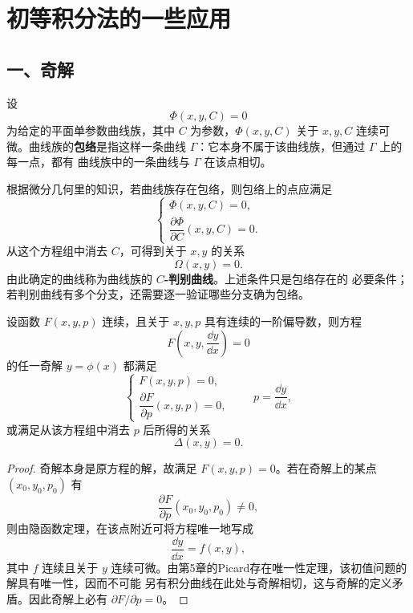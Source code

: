 \section{初等积分法的一些应用}\label{sec:初等积分法的一些应用}

\subsection*{一、奇解}

\begin{definition}\label{def:包络}
	设
\[
	\Phi(x,y,C)=0
\]
为给定的平面单参数曲线族，其中 $C$ 为参数，$\Phi(x,y,C)$ 关于
$x,y,C$ 连续可微。曲线族的\textbf{包络}是指这样一条曲线
$\Gamma$：它本身不属于该曲线族，但通过 $\Gamma$ 上的每一点，都有
曲线族中的一条曲线与 $\Gamma$ 在该点相切。
\end{definition}

根据微分几何里的知识，若曲线族存在包络，则包络上的点应满足
\[
	\begin{cases}
		\Phi(x,y,C)=0,\\
		\dfrac{\partial\Phi}{\partial C}(x,y,C)=0.
	\end{cases}
\]
从这个方程组中消去 $C$，可得到关于 $x,y$ 的关系
\[
	\Omega(x,y)=0.
\]
由此确定的曲线称为曲线族的 \textbf{$C$-判别曲线}。上述条件只是包络存在的
必要条件；若判别曲线有多个分支，还需要逐一验证哪些分支确为包络。

\begin{theorem}\label{thm:奇解的必要条件}
	设函数 $F(x,y,p)$ 连续，且关于 $x,y,p$ 具有连续的一阶偏导数，则方程
	\[
		F\left(x,y,\dfrac{\dd y}{\dd x}\right)=0
	\]
	的任一奇解 $y=\phi(x)$ 都满足
	\[
		\begin{cases}
			F(x,y,p)=0,\\
			\dfrac{\partial F}{\partial p}(x,y,p)=0,
		\end{cases}
		\qquad p=\dfrac{\dd y}{\dd x},
	\]
	或满足从该方程组中消去 $p$ 后所得的关系
	\[
		\Delta(x,y)=0.
	\]
\end{theorem}

\begin{proof}
	奇解本身是原方程的解，故满足 $F(x,y,p)=0$。若在奇解上的某点
	$(x_0,y_0,p_0)$ 有
	\[
		\dfrac{\partial F}{\partial p}(x_0,y_0,p_0)\neq 0,
	\]
	则由隐函数定理，在该点附近可将方程唯一地写成
	\[
		\dfrac{\dd y}{\dd x}=f(x,y),
	\]
	其中 $f$ 连续且关于 $y$ 连续可微。由第5章的Picard存在唯一性定理，该初值问题的解具有唯一性，因而不可能
	另有积分曲线在此处与奇解相切，这与奇解的定义矛盾。因此奇解上必有
	$\partial F/\partial p=0$。
\end{proof}


